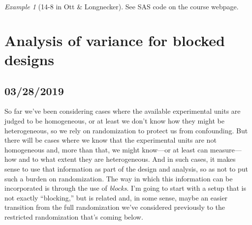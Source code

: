 \documentclass[a4paper, 12pt]{article}
\theoremstyle{plain}
\theoremstyle{definition}
\theoremstyle{remark}
\newtheorem*{example}{Example}
\begin{document}
\begin{example}[14-8 in Ott \& Longnecker]
See SAS code on the course webpage.
\end{example}





\section{Analysis of variance for blocked designs}

\subsection*{03/28/2019}

So far we've been considering cases where the available experimental units are judged to be homogeneous, or at least we don't know how they might be heterogeneous, so we rely on randomization to protect us from confounding.  But there will be cases where we know that the experimental units are not homogeneous and, more than that, we might know---or at least can measure---how and to what extent they are heterogeneous.  And in such cases, it makes sense to use that information as part of the design and analysis, so as not to put such a burden on randomization.  The way in which this information can be incorporated is through the use of {\em blocks}.  I'm going to start with a setup that is not exactly ``blocking,'' but is related and, in some sense, maybe an easier transition from the full randomization we've considered previously to the restricted randomization that's coming below.  
\end{document}
